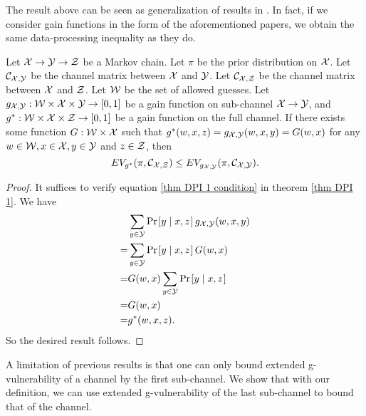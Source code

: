 The result above can be seen as generalization of results in \cite{6266165, 10.1007/978-3-642-54792-8_5, 7536368}. In fact, if we consider gain functions in the form of the aforementioned papers, we obtain the same data-processing inequality as they do.


\begin{corollary} \label{thm DPI 2}
	Let $\mathcal{X} \rightarrow \mathcal{Y} \rightarrow \mathcal{Z}$ be a Markov chain. Let $\pi$ be the prior distribution on $\mathcal{X}$. Let $\mathcal{C}_{\mathcal{X}, \mathcal{Y}}$ be the channel matrix between $\mathcal{X}$ and $\mathcal{Y}$. Let $\mathcal{C}_{\mathcal{X},\mathcal{Z}}$ be the channel matrix between $\mathcal{X}$ and $\mathcal{Z}$. Let $\mathcal{W}$ be the set of allowed guesses. Let $g_{\mathcal{X},\mathcal{Y}}: \mathcal{W} \times \mathcal{X} \times \mathcal{Y} \rightarrow [0,1]$ be a gain function on sub-channel $\mathcal{X} \rightarrow \mathcal{Y}$, and $g^{*}: \mathcal{W} \times \mathcal{X} \times \mathcal{Z} \rightarrow [0,1]$ be a gain function on the full channel. If there exists some function $G: \mathcal{W} \times \mathcal{X}$ such that $g^{*}(w, x, z) = g_{\mathcal{X}, \mathcal{Y}}(w, x, y) = G(w, x)$ for any $w \in \mathcal{W}, x \in \mathcal{X}, y \in \mathcal{Y}$ and $z \in \mathcal{Z}$, then
	\begin{equation*}
	EV_{g^{*}}(\pi, \mathcal{C}_{\mathcal{X},\mathcal{Z}}) \leq EV_{g_{\mathcal{X},\mathcal{Y}}}(\pi, \mathcal{C}_{\mathcal{X},\mathcal{Y}}).
	\end{equation*}
\end{corollary}


\begin{proof}
	It suffices to verify equation \ref{thm DPI 1 condition} in theorem \ref{thm DPI 1}. We have
	\begin{align*}
	  &	\sum_{y \in \Y} \prob{y \mid x, z} g_{\X, \Y}(w, x, y) \\
	= & \sum_{y \in \Y} \prob{y \mid x, z} G(w, x) \\
	= & G(w, x) \sum_{y \in \Y} \prob{y \mid x, z} \\
	= & G(w, x) \\
	= & g^{*}(w, x, z).
	\end{align*}
	So the desired result follows.
\end{proof}


A limitation of previous results is that one can only bound extended g-vulnerability of a channel by the first sub-channel. We show that with our definition, we can use extended g-vulnerability of the last sub-channel to bound that of the channel.


